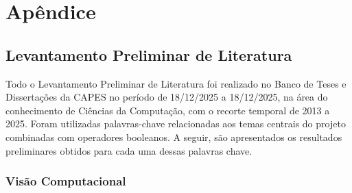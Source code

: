\section*{Apêndice}

\subsection*{Levantamento Preliminar de Literatura}
Todo o Levantamento Preliminar de Literatura foi realizado no Banco de Teses e Dissertações da CAPES no período de 18/12/2025 a 18/12/2025, na área do conhecimento de Ciências da Computação, com o recorte temporal de 2013 a 2025. Foram utilizadas palavras-chave relacionadas aos temas centrais do projeto combinadas com operadores booleanos. A seguir, são apresentados os resultados preliminares obtidos para cada uma dessas palavras chave.
\subsubsection{Visão Computacional}

